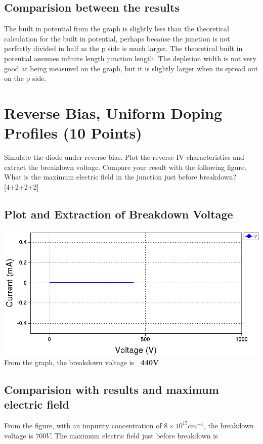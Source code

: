 \documentclass[12pt]{article}
\newcommand{\e}[1]{\times 10^{#1}}
\begin{document}
\subsection{Comparision between the results }
The built in potential from the graph is slightly less than the theoretical calculation for the built in potential, perhaps because the junction is not perfectly divided in half as the p side is much larger. The theoretical built in potential assumes infinite length junction length. The depletion width is not very good at being measured on the graph, but it is slightly larger when its spread out on the p side.


\section{Reverse Bias, Uniform Doping Profiles (10 Points)}

Simulate the diode under reverse bias. Plot the reverse IV characteristics and extract the breakdown voltage. Compare your result with the following figure. What is the maximum electric field in the junction just before breakdown? [4+2+2+2]

\subsection{Plot and Extraction of Breakdown Voltage}
\includegraphics[width=\textwidth]{2a.png}
From the graph, the breakdown voltage is \textbf{~440V}

\subsection{Comparision with results and maximum electric field}

From the figure, with an impurity concentration of $8\e{15}  cm^{-1}$, the breakdown voltage is $700V$. The maximum electric field just before breakdown is 
\end{document}
